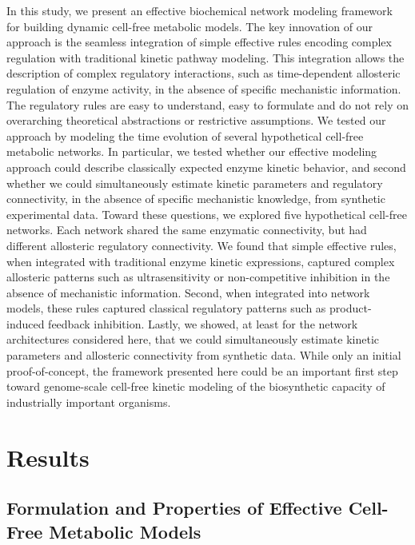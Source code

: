 \documentclass[processes,article,accept,moreauthors,pdftex,12pt,a4paper]{mdpi}
\begin{document}
In this study, we present an effective biochemical network modeling framework for building dynamic cell-free metabolic models.
The key innovation of our approach is the seamless integration of simple effective rules encoding complex regulation with traditional kinetic pathway modeling. 
This integration allows the description of complex regulatory interactions, such as time-dependent allosteric regulation of enzyme activity, in the absence of specific mechanistic information. 
The regulatory rules are easy to understand, easy to formulate and do not rely on overarching theoretical abstractions or restrictive assumptions. 
We tested our approach by modeling the time evolution of several hypothetical cell-free metabolic networks. 
In particular, we tested whether our effective modeling approach could describe classically expected enzyme kinetic behavior, and second whether we could simultaneously estimate kinetic parameters and regulatory connectivity, in the absence of specific mechanistic knowledge, from synthetic experimental data. 
Toward these questions, we explored five hypothetical cell-free networks. 
Each network shared the same enzymatic connectivity, but had different allosteric regulatory connectivity. 
We found that simple effective rules, when integrated with traditional enzyme kinetic expressions, captured complex allosteric patterns such as ultrasensitivity or non-competitive inhibition in the absence of mechanistic information. 
Second, when integrated into network models, these rules captured classical regulatory patterns such as product-induced feedback inhibition. 
Lastly, we showed, at least for the network architectures considered here, that we could simultaneously estimate kinetic parameters and allosteric connectivity from synthetic data. 
While only an initial proof-of-concept, the framework presented here could be an important first step toward genome-scale cell-free kinetic modeling of the biosynthetic capacity of industrially important organisms.

\newpage

\section{Results}\vspace{-12pt}


\subsection{Formulation and Properties of Effective Cell-Free Metabolic Models}
\end{document}
